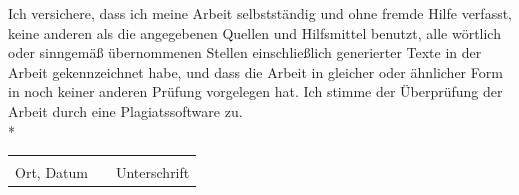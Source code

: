 Ich versichere, dass ich meine Arbeit selbstständig und ohne fremde Hilfe verfasst, keine anderen als die angegebenen Quellen und Hilfsmittel benutzt, alle wörtlich oder sinngemäß übernommenen Stellen einschließlich generierter Texte in der Arbeit gekennzeichnet habe, und dass die Arbeit in gleicher oder ähnlicher Form in noch keiner anderen Prüfung vorgelegen hat. Ich stimme der Überprüfung der Arbeit durch eine Plagiatssoftware zu.\\*


\vspace{25mm}
\begin{tabular}{@{}p{4cm}p{2cm}p{4cm}@{}}
\hrulefill && \hrulefill\\
Ort, Datum && Unterschrift\\
\end{tabular}

